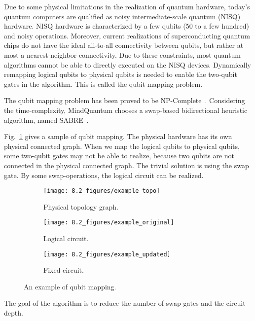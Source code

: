 
Due to some physical limitations in the realization of quantum hardware, today's quantum computers are qualified as noisy intermediate-scale quantum (NISQ) hardware. NISQ hardware is characterized by a few qubits (50 to a few hundred) and noisy operations. Moreover, current realizations of superconducting quantum chips do not have the ideal all-to-all connectivity between qubits, but rather at most a nearest-neighbor connectivity. Due to these constraints, most quantum algorithms cannot be able to directly executed on the NISQ devices. Dynamically remapping logical qubits to physical qubits is needed to enable the two-qubit gates in the algorithm. This is called the qubit mapping problem.

The qubit mapping problem has been proved to be NP-Complete~\cite{siraichi2018qubit}. Considering the time-complexity, MindQuantum chooses a swap-based bidirectional heuristic algorithm, named SABRE~\cite{li2019tackling}.

Fig.~\ref{fig:qubit-mapping-sample} gives a sample of qubit mapping.
The physical hardware has its own physical connected graph. When we map the logical qubits to physical qubits, some two-qubit gates may not be able to realize, because two qubits are not connected in the physical connected graph. The trivial solution is using the swap gate. By some swap-operations, the logical circuit can be realized.

\begin{figure}
	\centering
	\begin{subfigure}{0.1\textwidth}
		\centering
		\texttt{[image: 8.2\_figures/example\_topo]}
		\caption{Physical topology graph.}
	\end{subfigure}
	\begin{subfigure}{0.3\textwidth}
		\centering
		\texttt{[image: 8.2\_figures/example\_original]}
		\caption{Logical circuit.}
	\end{subfigure}

	\begin{subfigure}{0.45\textwidth}
		\centering
		\texttt{[image: 8.2\_figures/example\_updated]}
		\caption{Fixed circuit.}
	\end{subfigure}

	\caption{An example of qubit mapping.}
	\label{fig:qubit-mapping-sample}
\end{figure}

The goal of the algorithm is to reduce the number of swap gates and the circuit depth.


